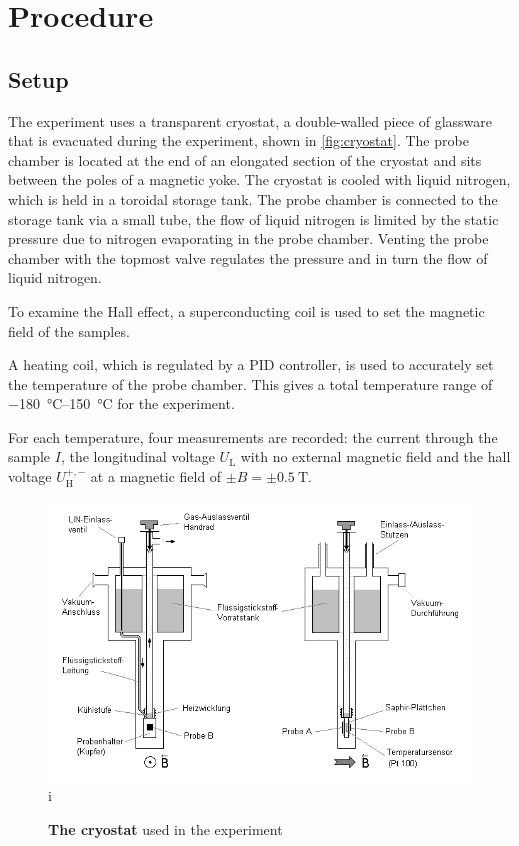 \chapter{Procedure}
\section{Setup}
The experiment uses a transparent cryostat, a double-walled piece of glassware  that is evacuated during the experiment, shown in \autoref{fig:cryostat}.
The probe chamber is located at the end of an elongated section of the cryostat and sits between the poles of a magnetic yoke.
The cryostat is cooled with liquid nitrogen, which is held in a toroidal storage tank.
The probe chamber is connected to the storage tank via a small tube, the flow of liquid nitrogen is limited by the static pressure due to nitrogen evaporating in the probe chamber.
Venting the probe chamber with the topmost valve regulates the pressure and in turn the flow of liquid nitrogen.

To examine the Hall effect, a superconducting coil is used to set the magnetic field of the samples.

A heating coil, which is regulated by a PID controller, is used to accurately set the temperature of the probe chamber.
This gives a total temperature range of \SIrange{-180}{150}{\celsius} for the experiment.

For each temperature, four measurements are recorded: the current through the sample $I$, the longitudinal voltage $U_\text{L}$ with no external magnetic field and the hall voltage $U_\text{H}^{+,-}$ at a magnetic field of $\pm B = \pm \SI{0.5}{\tesla}$. 

\begin{figure}
	\centering
	\includegraphics[width=.7\textwidth]{./img/cryostat.png}i
	\caption[Cryostat]{\textbf{The cryostat} used in the experiment}
	\label{fig:cryostat}
\end{figure}

